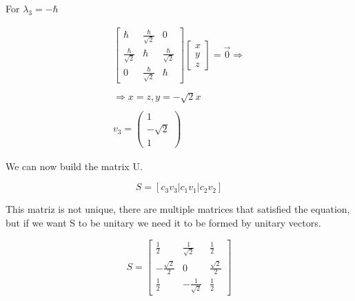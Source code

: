 For $\lambda_3= -\hbar$

\begin{equation}
  \begin{array}{c}
    \left[\begin{matrix}
      \hbar & \frac{\hbar}{\sqrt{2}} & 0\\
      \frac{\hbar}{\sqrt{2}} & \hbar & \frac{\hbar}{\sqrt{2}}\\
      0 & \frac{\hbar}{\sqrt{2}} & \hbar
    \end{matrix}\right]
    \left[\begin{matrix}
      x\\
      y\\
      z
    \end{matrix}\right] = \vec{0} \Rightarrow
    \\

    \\
    \Rightarrow x = z, y = -\sqrt{2}x
    \\

    \\
    v_3 = \left(\begin{matrix}
      1\\
      -\sqrt{2}\\
      1
    \end{matrix}\right)
  \end{array}
\end{equation}

We can now build the matrix U.

\begin{equation}
  S=[c_3 v_3 | c_1 v_1 | c_2 v_2]
\end{equation}


This matriz is not unique, there are multiple matrices that satisfied the equation, but if we want S to be unitary we need it to be formed by unitary vectors.

\begin{equation}
  S = \left[\begin{matrix}
    \frac{1}{2} & \frac{1}{\sqrt{2}} & \frac{1}{2}\\
    -\frac{\sqrt{2}}{2} & 0 & \frac{\sqrt{2}}{2}\\
    \frac{1}{2} & -\frac{1}{\sqrt{2}} & \frac{1}{2}
  \end{matrix}\right]
\end{equation}



